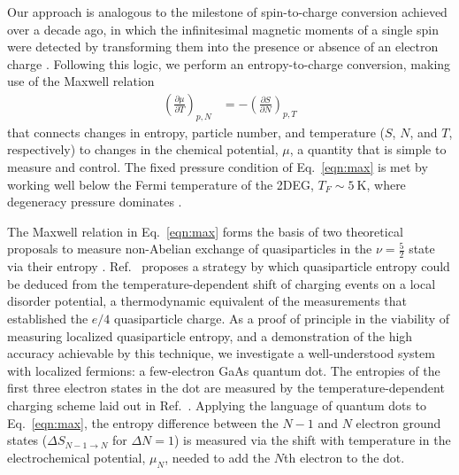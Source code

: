 \documentclass[twocolumn,showpacs,amsmath,amssymb,prl,aps,superscriptaddress]{revtex4-1}
\begin{document}
Our approach is analogous to the milestone of spin-to-charge conversion achieved over a decade ago, in which the infinitesimal magnetic moments of a single spin were detected by transforming them into the presence or absence of an electron charge \cite{Elzerman2004, Ono2004}.  Following this logic, we perform an entropy-to-charge conversion, making use of the Maxwell relation
%
\begin{align}
\label{eqn:max}
        \left(\frac{\partial \mu}{\partial T}\right)_{p,N} &= -\left(\frac{\partial S}{\partial N}\right)_{p,T}
\end{align}
%
that connects changes in entropy, particle number, and temperature ($S$, $N$, and $T$, respectively) to changes in the chemical potential, $\mu$, a quantity that is simple to measure and control. The fixed pressure condition of Eq.~\ref{eqn:max} is met by working well below the Fermi temperature of the 2DEG, $T_F \sim \SI{5}{\kelvin}$, where degeneracy pressure dominates \cite{Landau1969}.

The Maxwell relation in Eq.~\ref{eqn:max} forms the basis of two theoretical proposals to measure non-Abelian exchange of quasiparticles in  the $\nu = \frac{5}{2}$ state via their entropy
\cite{Cooper2009,Ben-Shach2013}.  Ref.~ proposes a strategy by which quasiparticle entropy could be deduced from the temperature-dependent shift of charging events on a local disorder potential, a thermodynamic equivalent of the measurements that established the $e/4$ quasiparticle charge\cite{Venkatachalam2011}.   As a proof of principle in the viability of measuring localized quasiparticle entropy, and a demonstration of the high accuracy achievable by this technique, we investigate a well-understood system with localized fermions: a few-electron GaAs quantum dot. The entropies of the first three electron states in the dot are measured by the temperature-dependent charging scheme laid out in Ref.~.   Applying the language of quantum dots to Eq.~\ref{eqn:max}, the entropy difference between the $N-1$ and $N$ electron ground states ($\Delta S_{N-1\rightarrow N}$ for $\Delta N=1$) is measured via the shift with temperature in the electrochemical potential, $\mu_N$, needed to add the $N$th electron to the dot. 
\end{document}
